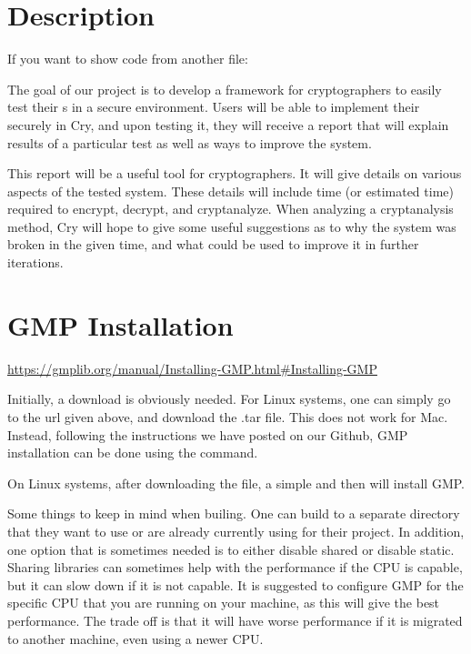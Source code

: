 \section{\cry{} Description}

If you want to show code from another file:
\codes{}


The goal of our project is to develop a framework for
cryptographers to easily test their \cs s in a
secure environment. Users will be able to implement their
\cs{} securely in Cry, and upon testing it, they will
receive a report that will explain results of a particular
test as well as ways to improve the system.

\medskip

This report will be a useful tool for cryptographers. It
will give details on various aspects of the tested system.
These details will include time (or estimated time) required
to encrypt, decrypt, and cryptanalyze. When analyzing a
cryptanalysis method, Cry will hope to give some useful
suggestions as to why the system was broken in the given
time, and what could be used to improve it in further
iterations.


\section{GMP Installation}

\url{https://gmplib.org/manual/Installing-GMP.html#Installing-GMP}

Initially, a download is obviously needed. For Linux systems, one can simply go to the url
given above, and download the .tar file. This does not work for Mac. Instead, following the
instructions we have posted on our Github, GMP installation can be done using the 
command.

On Linux systems, after downloading the file, a simple  and then 
will install GMP.

Some things to keep in mind when builing. One can build to a separate directory that they want to use or
are already currently using for their project. In addition, one option that is sometimes needed is to either
disable shared or disable static. Sharing libraries can sometimes help with the performance if the CPU is
capable, but it can slow down if it is not capable. It is suggested to configure GMP for the specific CPU that
you are running on your machine, as this will give the best performance. The trade off is that it will have worse performance
if it is migrated to another machine, even using a newer CPU.

